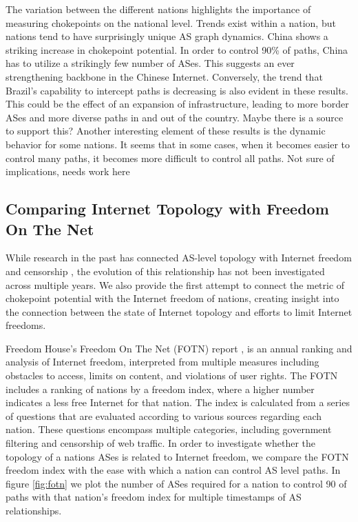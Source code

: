 \documentclass{article}
\begin{document}
\begin{multicols}{2}
\par 
The variation between the different nations highlights the importance of measuring
chokepoints on the national level. Trends exist within a nation, but nations
tend to have surprisingly unique AS graph dynamics. China shows a striking
increase in chokepoint potential. In order to control 90\% of paths, China has
to utilize a strikingly few number of ASes. This suggests an ever
strengthening backbone in the Chinese Internet. Conversely, the trend that
Brazil's capability to intercept paths is decreasing is also evident in these
results. This could be the effect of an expansion of infrastructure, leading
to more border ASes and more diverse paths in and out of the country. {\color{blue}Maybe
there is a source to support this?} Another interesting element of these
results is the dynamic behavior for some nations. It seems that in some cases,
when it becomes easier to control many paths, it becomes more difficult to
control all paths. {\color{blue}Not sure of implications, needs work here}

\subsection{Comparing Internet Topology with Freedom On The Net}
While research in the past has connected AS-level topology with Internet freedom 
and censorship \cite{throats}\cite{politicsrouting}, the evolution of this relationship has
not been investigated across multiple years. We also provide the first attempt to connect the
metric of chokepoint potential with the Internet freedom of nations, creating insight into the
connection between the state of Internet topology and efforts to limit Internet freedoms.
\par Freedom House's Freedom On The Net
(FOTN) report \cite{FOTN}, is an annual ranking and analysis of Internet
freedom, interpreted from multiple measures including obstacles to access,
limits on content, and violations of user rights. The FOTN includes a ranking
of nations by a freedom index, where a higher number indicates a less free
Internet for that nation. The index is calculated from a series of questions
that are evaluated according to various sources regarding each nation. These
questions encompass multiple categories, including government filtering and
censorship of web traffic. In order to investigate whether the topology of a
nations ASes is related to Internet freedom, we compare the FOTN freedom index
with the ease with which a nation can control AS level paths. In figure
\ref{fig:fotn} we plot the number of ASes required for a nation to control 90%
of paths with that nation's freedom index for multiple timestamps of AS
relationships.


\end{multicols}
\end{document}
